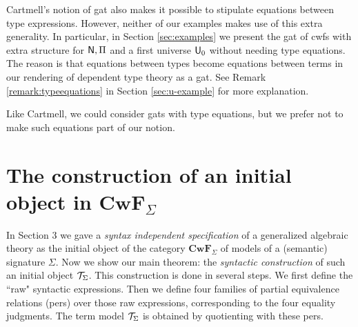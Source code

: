 \documentclass{lmcs}
\def\Cwf{\mathbf{CwF}}
\begin{document}
\begin{remark}
Cartmell's notion of gat \cite{cartmell:phd,cartmell:apal} also makes it possible to stipulate equations between type expressions. However, neither of our examples makes use of this extra generality. In particular,  in Section \ref{sec:examples} we present the gat of cwfs with extra structure for $\mathsf{N}, \Pi$ and a first universe $\mathsf{U}_0$ without needing type equations. The reason is that
equations between types become equations between terms in our rendering
of dependent type theory as a gat. See Remark \ref{remark:typeequations} in Section \ref{sec:u-example} for more explanation.

Like Cartmell, we could consider gats with type equations, but we prefer not to make such equations part of our notion.


\end{remark}



\section{The construction of an initial object in $\Cwf_\Sigma$}\label{initial-gat-section}

In Section 3 we gave a {\em syntax independent specification} of a generalized algebraic theory as the initial object of the category $\Cwf_\Sigma$ of models of a (semantic) signature $\Sigma$. Now we show our main theorem: the {\em syntactic construction} of such an initial object ${\mathcal T}_\Sigma$. This construction is done in several steps. We first define the ``raw" syntactic expressions. Then we define four families of partial equivalence relations (pers) over those raw expressions, corresponding to the four equality judgments. The term model ${\mathcal T}_\Sigma$ is obtained by quotienting with these pers.
\end{document}
